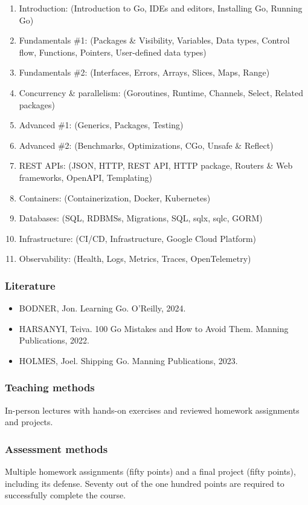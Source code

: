 \documentclass[
  digital,
  color,
  oneside,
  nosansbold,
  nocolorbold,
  nolof,
  nolot,
]{fithesis4}
\begin{document}
\begin{enumerate}
    \item Introduction: (Introduction to Go, IDEs and editors, Installing Go, Running Go)
    \item Fundamentals \#1: (Packages \& Visibility, Variables, Data types, Control flow, Functions, Pointers, User-defined data types)
    \item Fundamentals \#2: (Interfaces, Errors, Arrays, Slices, Maps, Range)
    \item Concurrency \& parallelism: (Goroutines, Runtime, Channels, Select, Related packages)
    \item Advanced \#1: (Generics, Packages, Testing)
    \item Advanced \#2: (Benchmarks, Optimizations, CGo, Unsafe \& Reflect)
    \item REST APIs: (JSON, HTTP, REST API, HTTP package, Routers \& Web frameworks, OpenAPI, Templating)
    \item Containers: (Containerization, Docker, Kubernetes)
    \item Databases: (SQL, RDBMSs, Migrations, SQL, sqlx, sqlc, GORM)
    \item Infrastructure: (CI/CD, Infrastructure, Google Cloud Platform)
    \item Observability: (Health, Logs, Metrics, Traces, OpenTelemetry)
\end{enumerate}

\subsubsection{Literature}

\begin{itemize}
    \item BODNER, Jon. Learning Go. O’Reilly, 2024.\cite{learning-go}
    \item HARSANYI, Teiva. 100 Go Mistakes and How to Avoid Them. Manning Publications, 2022.\cite{100-go-mistakes}
    \item HOLMES, Joel. Shipping Go. Manning Publications, 2023.\cite{shipping-go}
\end{itemize}

\subsubsection{Teaching methods}

In-person lectures with hands-on exercises and reviewed homework assignments and projects.

\subsubsection{Assessment methods}

Multiple homework assignments (fifty points) and a final project (fifty points), including its defense. Seventy out of the one hundred points are required to successfully complete the course.
\end{document}
